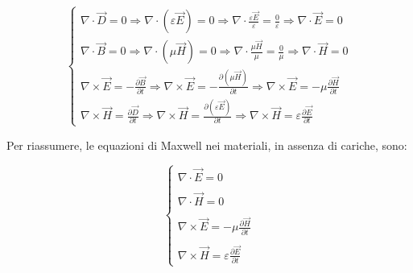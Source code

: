 {
    \Large 
    \begin{equation}
        \begin{cases}
         \nabla \cdot \vec{D} = 0 
\Rightarrow 
\nabla \cdot (\varepsilon \vec{E}) = 0
\Rightarrow
\nabla \cdot \frac{\varepsilon \vec{E}}{\varepsilon} = \frac{0}{\varepsilon}
\Rightarrow
\nabla \cdot \vec{E} = 0 \\
\nabla \cdot \vec{B} = 0 
\Rightarrow
\nabla \cdot (\mu \vec{H}) = 0
\Rightarrow
\nabla \cdot \frac{\mu \vec{H}}{\mu} = \frac{0}{\mu}
\Rightarrow
\nabla \cdot \vec{H} = 0 \\ 
\nabla \times \vec{E} = -\frac{\partial \vec{B}}{\partial t}
\Rightarrow
\nabla \times \vec{E} = -\frac{\partial (\mu \vec{H} )}{\partial t}
\Rightarrow
\nabla \times \vec{E} = -\mu \frac{\partial \vec{H}}{\partial t}\\ 
\nabla \times \vec{H} = \frac{\partial \vec{D}}{\partial t}
\Rightarrow
\nabla \times \vec{H} = \frac{\partial (\varepsilon \vec{E})}{\partial t}
\Rightarrow
\nabla \times \vec{H} = \varepsilon \frac{\partial \vec{E}}{\partial t}   
        \end{cases}
    \end{equation}
}

Per riassumere, le equazioni di Maxwell nei materiali, in assenza di cariche, sono: 

{ \Large \begin{equation}
    \begin{cases}
        
        \nabla \cdot \vec{E} = 0 \\ \\ 
        \nabla \cdot \vec{H} = 0 \\ \\ 
        \nabla \times \vec{E} = -\mu \frac{\partial \vec{H}}{\partial t} \\ \\ 
        \nabla \times \vec{H} = \varepsilon \frac{\partial \vec{E}}{\partial t} 


    \end{cases}
\end{equation}} 

